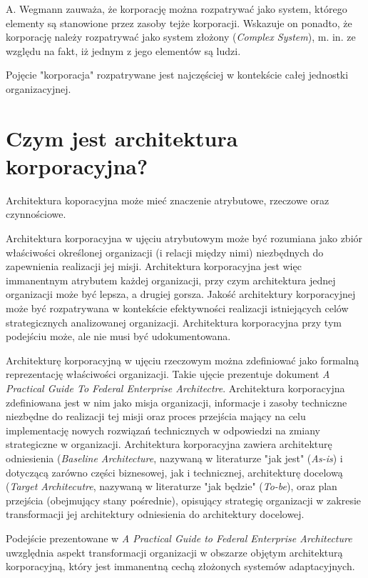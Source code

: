 A. Wegmann zauważa, że korporację można rozpatrywać jako system, którego elementy są stanowione przez zasoby tejże korporacji. Wskazuje on ponadto, że korporację należy rozpatrywać jako system złożony (\textit{Complex System}), m. in. ze względu na fakt, iż jednym z jego elementów są ludzi. 

Pojęcie "korporacja" rozpatrywane jest najczęściej w kontekście całej jednostki organizacyjnej. 
\section{Czym jest architektura korporacyjna?}
Architektura koporacyjna może mieć znaczenie atrybutowe, rzeczowe oraz czynnościowe.

Architektura korporacyjna w ujęciu atrybutowym może być rozumiana jako zbiór właściwości określonej organizacji (i relacji między nimi) niezbędnych do zapewnienia realizacji jej misji. Architektura korporacyjna jest więc immanentnym atrybutem każdej organizacji, przy czym architektura jednej organizacji może być lepsza, a drugiej gorsza. Jakość architektury korporacyjnej może być rozpatrywana w kontekście efektywności realizacji istniejących celów strategicznych analizowanej organizacji. Architektura korporacyjna przy tym podejściu może, ale nie musi być udokumentowana.

Architekturę korporacyjną w ujęciu rzeczowym można zdefiniować jako formalną reprezentację właściwości organizacji. Takie ujęcie prezentuje dokument \textit{A Practical Guide To Federal Enterprise Architectre}. Architektura korporacyjna zdefiniowana jest w nim jako misja organizacji, informacje i zasoby techniczne niezbędne do realizacji tej misji oraz proces przejścia mający na celu implementację nowych rozwiązań technicznych w odpowiedzi na zmiany strategiczne w organizacji. Architektura korporacyjna zawiera architekturę odniesienia (\textit{Baseline Architecture}, nazywaną w literaturze "jak jest" (\textit{As-is}) i dotyczącą zarówno części biznesowej, jak i technicznej, architekturę docelową (\textit{Target Architecutre}, nazywaną w literaturze "jak będzie" (\textit{To-be}), oraz plan przejścia (obejmujący stany pośrednie), opisujący strategię organizacji w zakresie transformacji jej architektury odniesienia do architektury docelowej. 

Podejście prezentowane w \textit{A Practical Guide to Federal Enterprise Architecture} uwzględnia aspekt transformacji organizacji w obszarze objętym architekturą korporacyjną, który jest immanentną cechą złożonych systemów adaptacyjnych. 

